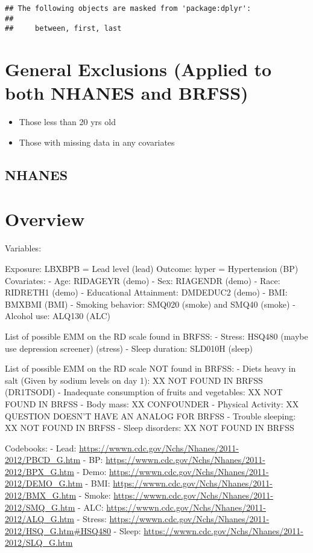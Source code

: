 \documentclass[
]{article}
\providecommand{\tightlist}{%
  \setlength{\itemsep}{0pt}\setlength{\parskip}{0pt}}
\begin{document}
\begin{verbatim}
## The following objects are masked from 'package:dplyr':
## 
##     between, first, last
\end{verbatim}

\section{General Exclusions (Applied to both NHANES and
BRFSS)}\label{general-exclusions-applied-to-both-nhanes-and-brfss}

\begin{itemize}
\tightlist
\item
  Those less than 20 yrs old
\item
  Those with missing data in any covariates
\end{itemize}

\subsection{NHANES}\label{nhanes}

\section{Overview}\label{overview}

Variables:

Exposure: LBXBPB = Lead level (lead) Outcome: hyper = Hypertension (BP)
Covariates: - Age: RIDAGEYR (demo) - Sex: RIAGENDR (demo) - Race:
RIDRETH1 (demo) - Educational Attainment: DMDEDUC2 (demo) - BMI: BMXBMI
(BMI) - Smoking behavior: SMQ020 (smoke) and SMQ40 (smoke) - Alcohol
use: ALQ130 (ALC)

List of possible EMM on the RD scale found in BRFSS: - Stress: HSQ480
(maybe use depression screener) (stress) - Sleep duration: SLD010H
(sleep)

List of possible EMM on the RD scale NOT found in BRFSS: - Diets heavy
in salt (Given by sodium levels on day 1): XX NOT FOUND IN BRFSS
(DR1TSODI) - Inadequate consumption of fruits and vegetables: XX NOT
FOUND IN BRFSS - Body mass: XX CONFOUNDER - Physical Activity: XX
QUESTION DOESN'T HAVE AN ANALOG FOR BRFSS - Trouble sleeping: XX NOT
FOUND IN BRFSS - Sleep disorders: XX NOT FOUND IN BRFSS

Codebooks: - Lead:
\url{https://wwwn.cdc.gov/Nchs/Nhanes/2011-2012/PBCD_G.htm} - BP:
\url{https://wwwn.cdc.gov/Nchs/Nhanes/2011-2012/BPX_G.htm} - Demo:
\url{https://wwwn.cdc.gov/Nchs/Nhanes/2011-2012/DEMO_G.htm} - BMI:
\url{https://wwwn.cdc.gov/Nchs/Nhanes/2011-2012/BMX_G.htm} - Smoke:
\url{https://wwwn.cdc.gov/Nchs/Nhanes/2011-2012/SMQ_G.htm} - ALC:
\url{https://wwwn.cdc.gov/Nchs/Nhanes/2011-2012/ALQ_G.htm} - Stress:
\url{https://wwwn.cdc.gov/Nchs/Nhanes/2011-2012/HSQ_G.htm\#HSQ480} -
Sleep: \url{https://wwwn.cdc.gov/Nchs/Nhanes/2011-2012/SLQ_G.htm}
\end{document}
